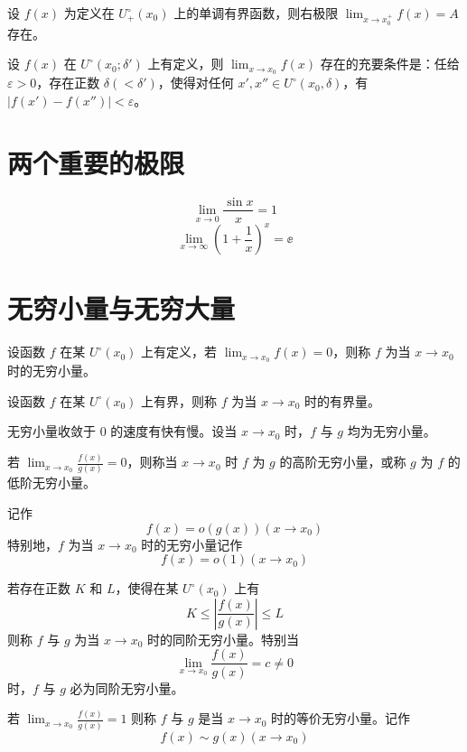 \begin{theorem}
    设 $f(x)$ 为定义在 $U_+^\circ(x_0)$ 上的单调有界函数，则右极限 $\displaystyle\lim_{x\to x_0^+}f(x)=A$ 存在。
\end{theorem}

\begin{theorem}[柯西准则]
    设 $f(x)$ 在 $U^\circ(x_0;\delta')$ 上有定义，则 $\displaystyle\lim_{x\to x_0}f(x)$ 存在的充要条件是：任给 $\varepsilon > 0$，存在正数 $\delta(<\delta')$，使得对任何 $x',x''\in U^\circ(x_0,\delta)$，有 $|f(x')-f(x'')|<\varepsilon$。
\end{theorem}

\section{两个重要的极限}

$$\lim_{x\to 0}\frac{\sin x}{x} = 1$$
$$\lim_{x\to \infty}\left(1+\frac{1}{x}\right)^x = \ee$$

\section{无穷小量与无穷大量}

\begin{definition}[无穷小量]
    设函数 $f$ 在某 $U^\circ(x_0)$ 上有定义，若 $\displaystyle\lim_{x\to x_0}f(x)=0$，则称 $f$ 为当 $x\to x_0$ 时的无穷小量。
\end{definition}

\begin{definition}[有界量]
    设函数 $f$ 在某 $U^\circ(x_0)$ 上有界，则称 $f$ 为当 $x\to x_0$ 时的有界量。
\end{definition}

无穷小量收敛于 $0$ 的速度有快有慢。设当 $x\to x_0$ 时，$f$ 与 $g$ 均为无穷小量。

若 $\displaystyle\lim_{x\to x_0}\frac{f(x)}{g(x)} = 0$，则称当 $x\to x_0$ 时 $f$ 为 $g$ 的高阶无穷小量，或称 $g$ 为 $f$ 的低阶无穷小量。

记作
$$f(x)=o(g(x))(x\to x_0)$$
特别地，$f$ 为当 $x\to x_0$ 时的无穷小量记作
$$f(x)=o(1)(x\to x_0)$$

若存在正数 $K$ 和 $L$，使得在某 $U^\circ(x_0)$ 上有
$$K\leqslant \left|\frac{f(x)}{g(x)}\right| \leqslant L$$
则称 $f$ 与 $g$ 为当 $x\to x_0$ 时的同阶无穷小量。特别当
$$\lim_{x\to x_0}\frac{f(x)}{g(x)} = c \ne 0$$
时，$f$ 与 $g$ 必为同阶无穷小量。

若 $\displaystyle\lim_{x\to x_0}\frac{f(x)}{g(x)} = 1$ 则称 $f$ 与 $g$ 是当 $x\to x_0$ 时的等价无穷小量。记作
$$f(x) \sim g(x) (x\to x_0)$$

